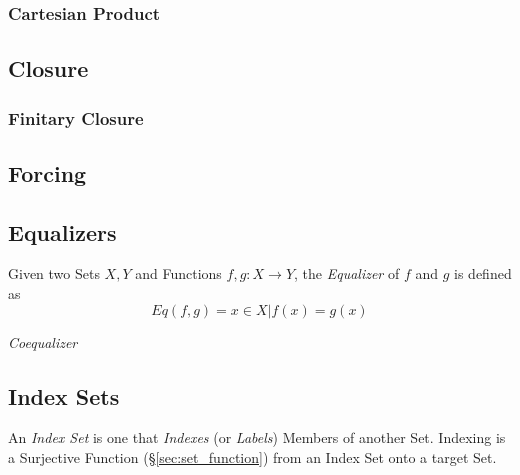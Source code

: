 \documentclass{article}
\begin{document}
\subsubsection{Cartesian Product}\label{subsec:set_product}



\subsection{Closure}\label{subsec:set_closure}

\subsubsection{Finitary Closure}\label{subsec:finitary_closure}

\subsection{Forcing}\label{subsec:forcing}

\subsection{Equalizers}\label{subsec:set_equalizer}

Given two Sets $X,Y$ and Functions $f,g : X \rightarrow Y$, the
\emph{Equalizer} of $f$ and $g$ is defined as
\[
    Eq(f,g) = { x \in X | f(x) = g(x) }
\]

\emph{Coequalizer}

\subsection{Index Sets}\label{subsec:index_set}

An \emph{Index Set} is one that \emph{Indexes} (or \emph{Labels})
Members of another Set. Indexing is a Surjective Function
(\S\ref{sec:set_function}) from an Index Set onto a target Set.
\end{document}
